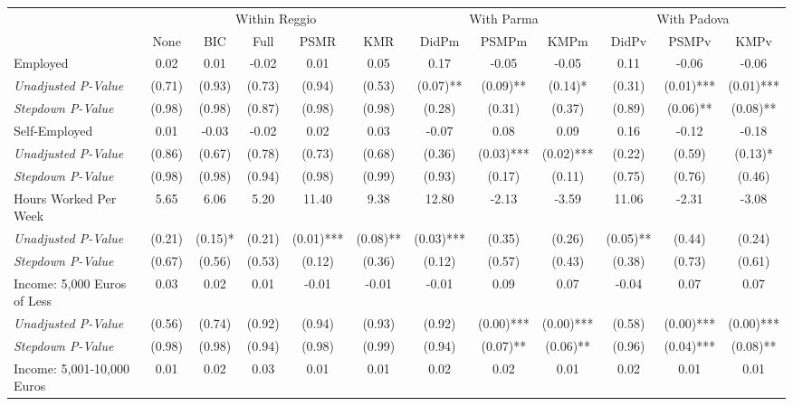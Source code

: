 \begin{tabular}{l c c c c c c c c c c c}
\toprule
& \multicolumn{5}{c}{Within Reggio} & \multicolumn{3}{c}{With Parma} & \multicolumn{3}{c}{With Padova} \\\cmidrule(lr){2-6} \cmidrule(lr){7-9} \cmidrule(lr){10-12}
 & None & BIC & Full & PSMR & KMR & DidPm & PSMPm & KMPm & DidPv & PSMPv & KMPv \\
\midrule
Employed & 0.02 & 0.01 & -0.02 & 0.01 & 0.05 & 0.17 & -0.05 & -0.05 & 0.11 & -0.06 & -0.06 \\
\quad \textit{Unadjusted P-Value} & (0.71) & (0.93) & (0.73) & (0.94) & (0.53) & (0.07)** & (0.09)** & (0.14)* & (0.31) & (0.01)*** & (0.01)*** \\
\quad \textit{Stepdown P-Value} & (0.98) & (0.98) & (0.87) & (0.98) & (0.98) & (0.28) & (0.31) & (0.37) & (0.89) & (0.06)** & (0.08)** \\
Self-Employed & 0.01 & -0.03 & -0.02 & 0.02 & 0.03 & -0.07 & 0.08 & 0.09 & 0.16 & -0.12 & -0.18 \\
\quad \textit{Unadjusted P-Value} & (0.86) & (0.67) & (0.78) & (0.73) & (0.68) & (0.36) & (0.03)*** & (0.02)*** & (0.22) & (0.59) & (0.13)* \\
\quad \textit{Stepdown P-Value} & (0.98) & (0.98) & (0.94) & (0.98) & (0.99) & (0.93) & (0.17) & (0.11) & (0.75) & (0.76) & (0.46) \\
Hours Worked Per Week & 5.65 & 6.06 & 5.20 & 11.40 & 9.38 & 12.80 & -2.13 & -3.59 & 11.06 & -2.31 & -3.08 \\
\quad \textit{Unadjusted P-Value} & (0.21) & (0.15)* & (0.21) & (0.01)*** & (0.08)** & (0.03)*** & (0.35) & (0.26) & (0.05)** & (0.44) & (0.24) \\
\quad \textit{Stepdown P-Value} & (0.67) & (0.56) & (0.53) & (0.12) & (0.36) & (0.12) & (0.57) & (0.43) & (0.38) & (0.73) & (0.61) \\
Income: 5,000 Euros of Less & 0.03 & 0.02 & 0.01 & -0.01 & -0.01 & -0.01 & 0.09 & 0.07 & -0.04 & 0.07 & 0.07 \\
\quad \textit{Unadjusted P-Value} & (0.56) & (0.74) & (0.92) & (0.94) & (0.93) & (0.92) & (0.00)*** & (0.00)*** & (0.58) & (0.00)*** & (0.00)*** \\
\quad \textit{Stepdown P-Value} & (0.98) & (0.98) & (0.94) & (0.98) & (0.99) & (0.94) & (0.07)** & (0.06)** & (0.96) & (0.04)*** & (0.08)** \\
Income: 5,001-10,000 Euros & 0.01 & 0.02 & 0.03 & 0.01 & 0.01 & 0.02 & 0.02 & 0.01 & 0.02 & 0.01 & 0.01 \\

\end{tabular}
